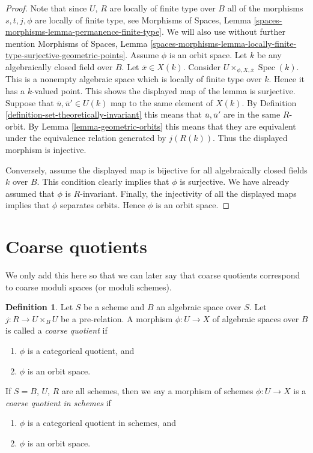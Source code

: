 \documentclass{stacks-project}
\theoremstyle{plain}
\theoremstyle{definition}
\newtheorem{definition}[subsection]{Definition}
\theoremstyle{remark}
\numberwithin{equation}{subsection}
\def\Spec{\mathop{\mathrm{Spec}}}
\begin{document}
\begin{proof}
Note that since $U$, $R$ are locally of finite type over $B$ all of the
morphisms $s, t, j, \phi$ are locally of finite type, see
Morphisms of Spaces, Lemma \ref{spaces-morphisms-lemma-permanence-finite-type}.
We will also use without further mention
Morphisms of Spaces, Lemma
\ref{spaces-morphisms-lemma-locally-finite-type-surjective-geometric-points}.
Assume $\phi$ is an orbit space. Let $k$ be any algebraically closed
field over $B$. Let $\overline{x} \in X(k)$. Consider
$U \times_{\phi, X, \overline{x}} \Spec(k)$.
This is a nonempty algebraic space
which is locally of finite type over $k$. Hence it has a $k$-valued point.
This shows the displayed map of the lemma is surjective.
Suppose that $\overline{u}, \overline{u}' \in U(k)$ map to the same
element of $X(k)$. By
Definition \ref{definition-set-theoretically-invariant}
this means that $\overline{u}, \overline{u}'$ are in the same
$R$-orbit. By Lemma \ref{lemma-geometric-orbits} this means that
they are equivalent under the equivalence relation generated by
$j(R(k))$. Thus the displayed morphism is injective.

\medskip\noindent
Conversely, assume the displayed map is bijective for all algebraically
closed fields $k$ over $B$. This condition clearly implies that $\phi$
is surjective. We have already assumed that $\phi$ is $R$-invariant.
Finally, the injectivity of all the displayed maps implies that
$\phi$ separates orbits. Hence $\phi$ is an orbit space.
\end{proof}










\section{Coarse quotients}
\label{section-coarse}

\noindent
We only add this here so that we can later say that coarse quotients
correspond to coarse moduli spaces (or moduli schemes).

\begin{definition}
\label{definition-coarse}
Let $S$ be a scheme and $B$ an algebraic space over $S$.
Let $j : R \to U \times_B U$ be a pre-relation.
A morphism $\phi : U \to X$ of algebraic spaces over $B$
is called a {\it coarse quotient} if
\begin{enumerate}
\item $\phi$ is a categorical quotient, and
\item $\phi$ is an orbit space.
\end{enumerate}
If $S = B$, $U$, $R$ are all schemes, then we say a morphism of schemes
$\phi : U \to X$ is a {\it coarse quotient in schemes} if
\begin{enumerate}
\item $\phi$ is a categorical quotient in schemes, and
\item $\phi$ is an orbit space.
\end{enumerate}
\end{definition}
\end{document}
